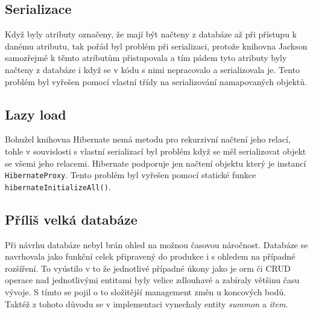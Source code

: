 \subsection{Serializace} %
Když byly atributy označeny, že mají být načteny z databáze až při přístupu k danému atributu, tak pořád byl problém při serializaci, protože knihovna Jackson samozřejmě k těmto atributům přistupovala a tím pádem tyto atributy byly načteny z databáze i když se v kódu s nimi nepracovalo a serializovala je. Tento problém byl vyřešen pomocí vlastní třídy 
na serializování namapovaných objektů. 

\subsection{Lazy load}
Bohužel knihovna Hibernate nemá metodu pro rekurzivní načtení jeho relací, tohle v souvislosti s vlastní serializací byl problém když se měl serializovat objekt se všemi jeho relacemi. Hibernate podporuje jen načtení objektu který je instancí \texttt{HibernateProxy}. Tento problém byl vyřešen pomocí statické funkce \texttt{hibernateInitializeAll()}. 

\subsection{Příliš velká databáze}
Při návrhu databáze nebyl brán ohled na možnou časovou náročnost. Databáze se navrhovala jako funkční celek připravený do produkce i s ohledem na případné rozšíření. To vyústilo v to že jednotlivé případné úkony jako je \gls{orm} či CRUD operace nad jednotlivými entitami byly velice zdlouhavé a zabíraly většinu času vývoje. S tímto se pojil o to složitější management změn u koncových bodů. Taktéž z tohoto důvodu se v implementaci vynechaly entity \textit{summon} a \textit{item}.
